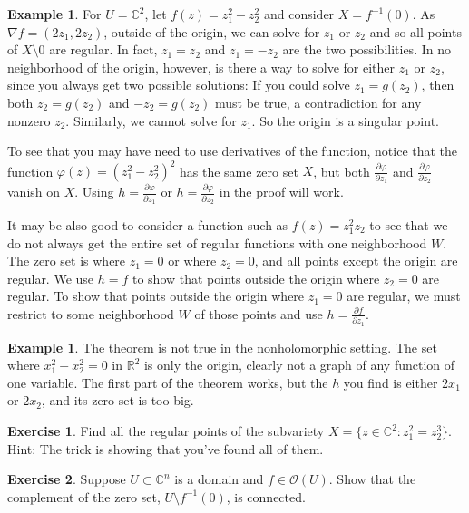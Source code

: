 \documentclass[12pt,openany]{book}
\newcommand{\C}{{\mathbb{C}}}
\newcommand{\R}{{\mathbb{R}}}
\newcommand{\sO}{{\mathscr{O}}}
\theoremstyle{plain}
\theoremstyle{remark}
\theoremstyle{definition}
\newenvironment{exbox}{%
    \def\FrameCommand{\vrule width 1pt \relax\hspace{10pt}}%
    \MakeFramed{\advance\hsize-\width\FrameRestore}%
}{%
    \endMakeFramed
}
\theoremstyle{exercise}
\newtheorem{exercise}{Exercise}[section]
\theoremstyle{example}
\newtheorem{example}[thm]{Example}
\begin{document}
\begin{example}
For $U = \C^2$,
let $f(z) = z_1^2-z_2^2$ and consider $X = f^{-1}(0)$. As $\nabla f =
(2z_1,2z_2)$,
outside of the origin, we can solve for $z_1$ or $z_2$ and so
all points of $X \setminus 0$ are regular.  In fact,
$z_1 = z_2$ and $z_1 = -z_2$ are the two possibilities.
In no neighborhood of the origin, however, is there a way to solve for either
$z_1$ or $z_2$, since you always get two possible solutions:  If you could
solve $z_1 = g(z_2)$, then both $z_2 = g(z_2)$ and $-z_2 = g(z_2)$ must be
true, a contradiction for any nonzero $z_2$.  Similarly,
we cannot solve for $z_1$.
So the origin is a singular point.

To see that you may have need to use derivatives of the function, notice
that the function $\varphi(z) = {(z_1^2-z_2^2)}^2$ has the same zero set $X$,
but both
$\frac{\partial \varphi}{\partial z_1}$ and
$\frac{\partial \varphi}{\partial z_2}$ vanish on $X$.  Using
$h= \frac{\partial \varphi}{\partial z_1}$ or
$h= \frac{\partial \varphi}{\partial z_2}$ in the proof will work.

It may be also good to consider a function such as $f(z) = z_1^2z_2$ to see
that we do not always get the entire set of regular functions with one
neighborhood $W$.  The
zero set is where $z_1=0$ or where $z_2=0$, and all points except the origin
are regular.  We use $h=f$ to show that points outside the origin
where $z_2=0$ are regular.
To show that points outside the origin
where $z_1=0$ are regular, we must restrict to some neighborhood $W$
of those points and use $h = \frac{\partial f}{\partial z_1}$.
\end{example}

\begin{example}
The theorem is not true in the nonholomorphic setting.  The set
where $x_1^2 +  x_2^2 = 0$ in $\R^2$ is only the origin, clearly not a graph
of any function of one variable.  The first part of the theorem works, but
the $h$ you find is either $2x_1$ or $2x_2$, and its zero set is too big.
\end{example}

\begin{exbox}
\begin{exercise}
Find all the regular points of the subvariety
$X = \bigl\{ z \in \C^2 : z_1^2 = z_2^3 \bigr\}$.
Hint: The trick is showing that you've found all of them.
\end{exercise}

\begin{exercise} \label{exercise:connectedcomplement}
Suppose $U \subset \C^n$ is a domain and $f \in \sO(U)$.
Show that the complement of the zero set, $U \setminus f^{-1}(0)$, is
connected.
\end{exercise}
\end{exbox}
\end{document}
